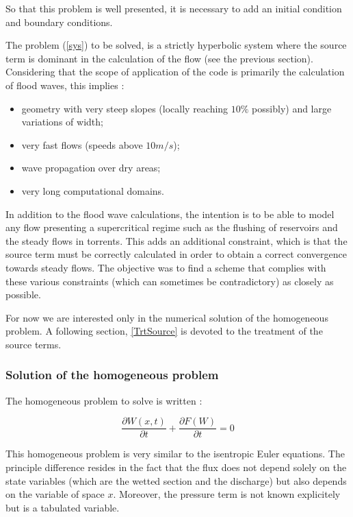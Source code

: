So that this problem is well presented, it is necessary to add an initial condition and boundary conditions.

The problem (\ref{sys}) to be solved, is a strictly hyperbolic system where the source term is dominant in the calculation of the flow (see the previous section).
Considering that the scope of application of the \mascaret{} code is primarily the calculation of flood waves, this implies :
\begin{itemize}
 \item geometry with very steep slopes (locally reaching $10\%$ possibly) and large variations of width;
 \item very fast flows (speeds above $10 m/s$);
 \item wave propagation over dry areas;
 \item very long computational domains.
\end{itemize}

In addition to the flood wave calculations, the intention is to be able to model any flow presenting a supercritical regime such as the flushing of reservoirs and the steady flows in torrents. This adds an additional constraint, which is that the source term must be correctly calculated in order to obtain a correct convergence towards steady flows. The objective was to find a scheme that complies with these various constraints (which can sometimes be contradictory) as closely as possible.
\vspace{0.5cm}

For now we are interested only in the numerical solution of the homogeneous problem. A following section, \ref{TrtSource} is devoted to the treatment of the source terms.

\subsubsection{Solution of the homogeneous problem}
\label{PbHom}

The homogeneous problem to solve is written :

\begin{equation}
 \frac{\partial W(x,t)}{\partial t} + \frac{\partial F(W)}{\partial t} = 0
\end{equation}

This homogeneous problem is very similar to the isentropic Euler equations. The principle difference resides in the fact that the flux does not depend solely on the state variables (which are the wetted section and the discharge) but also depends on the variable of space $x$. Moreover, the pressure term is not known explicitely but is a tabulated variable.


